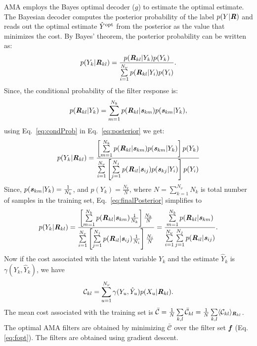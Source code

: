 \documentclass{jov}
\begin{document}
AMA employs the Bayes optimal decoder ($g$) to estimate the optimal estimate. The Bayesian decoder computes the posterior probability of the label $p(Y|{\textbf {\textit R}})$ and reads out the optimal estimate $\hat{Y}^{\rm opt}$ from the posterior as the value that minimizes the cost. By Bayes' theorem, the posterior probability can be written as:
\begin{align}
p(Y_k|{\textbf {\textit R} }_{kl}) = \frac{p({\textbf {\textit R} }_{kl}|Y_k)p(Y_k)}{\sum\limits_{i=1}^{N_{\nu}}{p({\textbf {\textit R} }_{kl}|Y_i)p(Y_i)}}.
\label{eq:posterior}
\end{align}
Since, the conditional probability of the filter response is:
\begin{align}
p({\textbf {\textit R} }_{kl}|Y_k) = \sum\limits_{m=1}^{N_k}p({\textbf {\textit R} }_{kl}|{\textbf {\textit s} }_{km})p({\textbf {\textit s} }_{km}|Y_k),
\label{eq:condProb}
\end{align}
using Eq.~\ref{eq:condProb} in Eq.~\ref{eq:posterior} we get:
\begin{align}
p(Y_k|{\textbf {\textit R} }_{kl}) = \frac{\left[\sum\limits_{m=1}^{N_k}p({\textbf {\textit R} }_{kl}|{\textbf {\textit s} }_{km})p({\textbf {\textit s} }_{km}|Y_k)\right]p(Y_k)}{\sum\limits_{i=1}^{N_{\nu}}{\left[\sum\limits_{j=1}^{N_j}p({\textbf {\textit R} }_{il}|{\textbf {\textit s} }_{ij})p({\textbf {\textit s} }_{kj}|Y_i)\right]p(Y_i)}}
\label{eq:finalPosterior}
\end{align}
Since, $p({\textbf {\textit s} }_{km}|Y_k) = \frac{1}{N_k}$, and $p(Y_k)=\frac{N_k}{N}$, where $N = \sum\limits_{k=1}^{N_{\nu}}N_{k}$ is total number of samples in the training set, Eq.~\ref{eq:finalPosterior} simplifies to
\begin{align}
p(Y_k|{\textbf {\textit R} }_{kl}) = \frac{\left[\sum\limits_{m=1}^{N_k}p({\textbf {\textit R} }_{kl}|{\textbf {\textit s} }_{km}) \frac{1}{N_k}\right]\frac{N_k}{N}}{\sum\limits_{i=1}^{N_{\nu}}{\left[\sum\limits_{j=1}^{N_j}p({\textbf {\textit R} }_{il}|{\textbf {\textit s} }_{ij}) \frac{1}{N_i}\right]\frac{N_i}{N}}} = \frac{\sum\limits_{m=1}^{N_k}p({\textbf {\textit R} }_{kl}|{\textbf {\textit s} }_{km})}{\sum\limits_{i=1}^{N_{\nu}}{\sum\limits_{j=1}^{N_j}p({\textbf {\textit R} }_{il}|{\textbf {\textit s} }_{ij})}}.
\label{eq:simplifiedPosterior}
\end{align}
Now if the cost associated with the latent variable $Y_k$ and the estimate $\hat{Y}_k$ is $\gamma (Y_k,\hat{Y}_k)$, we have  
\begin{align}
\mathcal{C}_{kl} = \sum\limits_{u=1}^{N_{\nu}}\gamma(Y_u,\hat{Y}_u)p(X_u|{\textbf{\textit R}}_{kl}).
\end{align}
The mean cost associated with the training set is $\bar{\mathcal{C}} = \frac{1}{N} \sum\limits_{k,l}\bar{\mathcal{C}}_{kl} = \frac{1}{N} \sum\limits_{k,l}\langle \mathcal{C}_{kl}\rangle_{{\textbf{\textit R}}_{kl}}$. The optimal AMA filters are obtained by minimizing $\bar{\mathcal{C}}$ over the filter set ${\textbf {\textit f} }$ (Eq.\ref{eq:fopt}). The filters are obtained using gradient descent.
\end{document}
